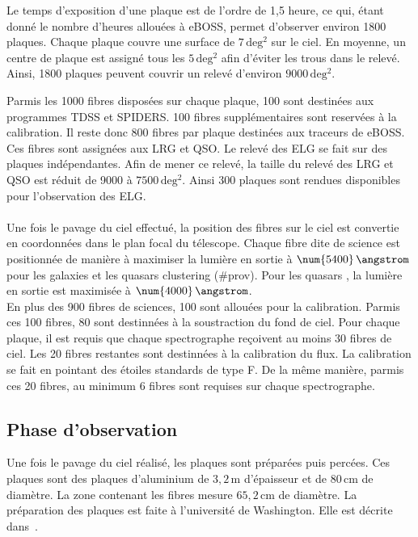 \documentclass[11pt, twoside, a4paper, openright]{report}
\begin{document}
Le temps d'exposition d'une plaque est de l'ordre de 1,5 heure, ce qui, étant donné le nombre d'heures allouées à eBOSS, permet d'observer environ \num{1800} plaques.
Chaque plaque couvre une surface de $7\,\mathrm{deg^{2}}$ sur le ciel. En moyenne, un centre de plaque est assigné tous les $5\,\mathrm{deg^{2}}$ afin d'éviter les trous dans le relevé. 
Ainsi, \num{1800} plaques peuvent couvrir un relevé d'environ $\num{9000}\,\mathrm{deg^{2}}$. 

Parmis les \num{1000} fibres disposées sur chaque plaque, \num{100} sont destinées aux programmes TDSS et SPIDERS. \num{100} fibres supplémentaires sont reservées à la calibration. Il reste donc \num{800} fibres par plaque destinées aux traceurs de eBOSS. Ces fibres sont assignées aux LRG et QSO. Le relevé des ELG se fait sur des plaques indépendantes. Afin de mener ce relevé, la taille du relevé des LRG et QSO est réduit de \num{9000} à $\num{7500}\,\mathrm{deg^{2}}$. Ainsi \num{300} plaques sont rendues disponibles pour l'observation des ELG.


\paragraph{} Une fois le pavage du ciel effectué, la position des fibres sur le ciel est convertie en coordonnées dans le plan focal du télescope. Chaque fibre dite de science est positionnée de manière à maximiser la lumière en sortie à $\num{5400}\,\angstrom$ pour les galaxies et les quasars clustering (\#prov). Pour les quasars \lya, la lumière en sortie est maximisée à $\num{4000}\,\angstrom$. \\
En plus des \num{900} fibres de sciences, \num{100} sont allouées pour la calibration. Parmis ces \num{100} fibres, \num{80} sont destinnées à la soustraction du fond de ciel. Pour chaque plaque, il est requis que chaque spectrographe reçoivent au moins \num{30} fibres de ciel. Les \num{20} fibres restantes sont destinnées à la calibration du flux. La calibration se fait en pointant des étoiles standards de type F. De la même manière, parmis ces \num{20} fibres, au minimum \num{6} fibres sont requises sur chaque spectrographe.


\subsection{Phase d'observation}

Une fois le pavage du ciel réalisé, les plaques sont préparées puis percées. Ces plaques sont des plaques d'aluminium de $3,2\,\mathrm{m}$ d'épaisseur et de $80\,\mathrm{cm}$ de diamètre. La zone contenant les fibres mesure $65,2\,\mathrm{cm}$ de diamètre. La préparation des plaques est faite à l'université de Washington. Elle est décrite dans~\cite{Blanton2017}.
\end{document}
